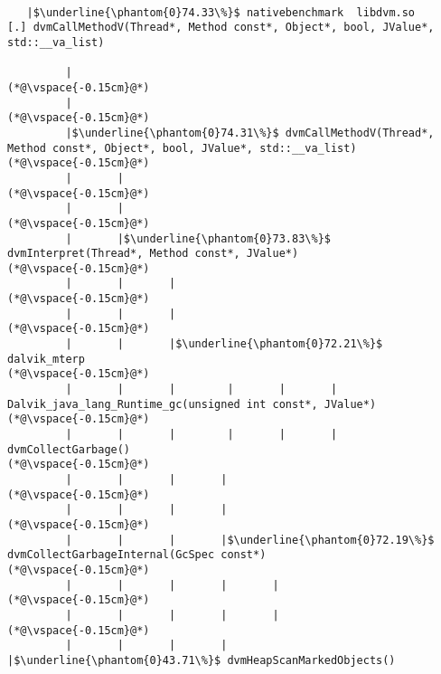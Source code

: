
\begin{lstlisting}[caption=NewDirectByteBuffer, label=profile:C2JNewDirectBuffer-512, numberbychapter=true, frame=lines, float, floatplacement=t]

   |$\underline{\phantom{0}74.33\%}$ nativebenchmark  libdvm.so           [.] dvmCallMethodV(Thread*, Method const*, Object*, bool, JValue*, std::__va_list)

         |
(*@\vspace{-0.15cm}@*)
         |
(*@\vspace{-0.15cm}@*)
         |$\underline{\phantom{0}74.31\%}$ dvmCallMethodV(Thread*, Method const*, Object*, bool, JValue*, std::__va_list)
(*@\vspace{-0.15cm}@*)
         |       |
(*@\vspace{-0.15cm}@*)
         |       |
(*@\vspace{-0.15cm}@*)
         |       |$\underline{\phantom{0}73.83\%}$ dvmInterpret(Thread*, Method const*, JValue*)
(*@\vspace{-0.15cm}@*)
         |       |       |
(*@\vspace{-0.15cm}@*)
         |       |       |
(*@\vspace{-0.15cm}@*)
         |       |       |$\underline{\phantom{0}72.21\%}$ dalvik_mterp
(*@\vspace{-0.15cm}@*)
         |       |       |        |       |       |       Dalvik_java_lang_Runtime_gc(unsigned int const*, JValue*)
(*@\vspace{-0.15cm}@*)
         |       |       |        |       |       |       dvmCollectGarbage()
(*@\vspace{-0.15cm}@*)
         |       |       |       |
(*@\vspace{-0.15cm}@*)
         |       |       |       |
(*@\vspace{-0.15cm}@*)
         |       |       |       |$\underline{\phantom{0}72.19\%}$ dvmCollectGarbageInternal(GcSpec const*)
(*@\vspace{-0.15cm}@*)
         |       |       |       |       |
(*@\vspace{-0.15cm}@*)
         |       |       |       |       |
(*@\vspace{-0.15cm}@*)
         |       |       |       |       |$\underline{\phantom{0}43.71\%}$ dvmHeapScanMarkedObjects()

\end{lstlisting}
